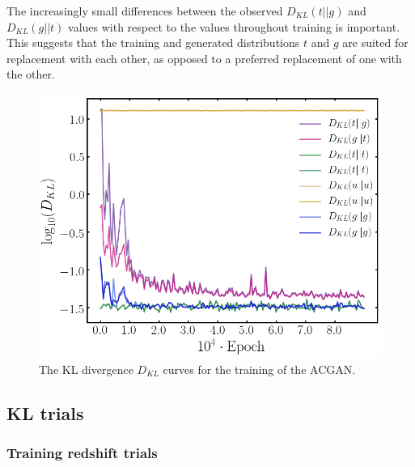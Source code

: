 \documentclass[twocolumn]{article}
\numberwithin{equation}{section}
\begin{document}
The increasingly small differences between the observed $D_{KL}(t||g)$ and $D_{KL}(g||t)$ values with respect to the values 
throughout training is important. This suggests that the training and generated distributions $t$ and $g$ are suited for 
replacement with each other, as opposed to a preferred replacement of one with the other.

\begin{figure}[!ht]%
\includegraphics[width=\columnwidth]{figures/graphs/stats.png}
\centering
\caption{The KL divergence $D_{KL}$ curves for the training of the ACGAN.}
\label{fig:2dgan_losscurve}
\end{figure}


\subsection{KL trials}\label{sec:kl_trials}


\subsubsection{Training redshift trials}
\end{document}
